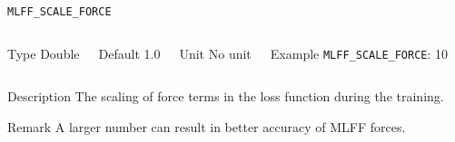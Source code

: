 \begin{frame}[allowframebreaks]{\texttt{{MLFF\_SCALE\_FORCE}}} \label{MLFF_SCALE_FORCE}
\vspace*{-12pt}
\begin{columns}
\begin{block}{Type}
Double
\end{block}

\begin{block}{Default}
1.0
\end{block}

\begin{block}{Unit}
No unit
\end{block}

\begin{block}{Example}
\texttt{MLFF\_SCALE\_FORCE}: 10
\end{block}
\end{columns}

\begin{block}{Description}
 The scaling of force terms in the loss function during the training.
\end{block}

\begin{block}{Remark}
A larger number can result in better accuracy of MLFF forces.
\end{block}
\end{frame}


